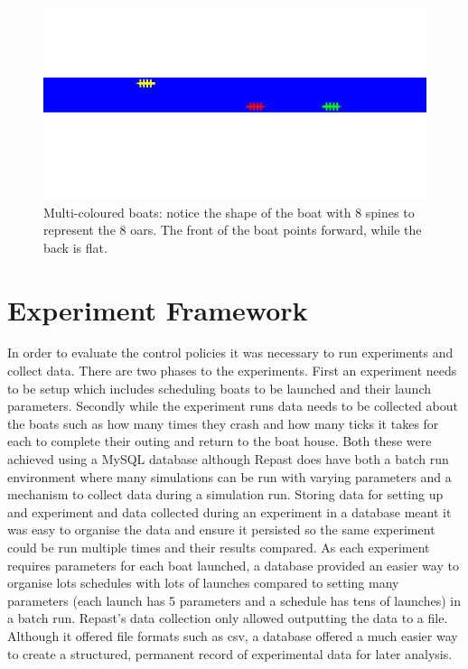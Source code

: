     \begin{figure}[h]
    \begin{center}
      \includegraphics[scale=0.3]{images/boats.png}
      \caption{Multi-coloured boats: notice the shape of the boat with 8 spines to represent the 8 oars. The front of the boat points forward, while the back is flat.}
      \label{techissues:fig:boats}
    \end{center}
    \end{figure}
      
  \section{Experiment Framework}
  In order to evaluate the control policies it was necessary to run experiments and collect data. There are two phases to the experiments. First an experiment needs to be setup which includes scheduling boats to be launched and their launch parameters. Secondly while the experiment runs data needs to be collected about the boats such as how many times they crash and how many ticks it takes for each to complete their outing and return to the boat house. Both these were achieved using a MySQL database although Repast does have both a batch run environment where many simulations can be run with varying parameters and a mechanism to collect data during a simulation run. Storing data for setting up and experiment and data collected during an experiment in a database meant it was easy to organise the data and ensure it persisted so the same experiment could be run multiple times and their results compared. As each experiment requires parameters for each boat launched, a database provided an easier way to organise lots schedules with lots of launches compared to setting many parameters (each launch has 5 parameters and a schedule has tens of launches) in a batch run. Repast's data collection only allowed outputting the data to a file. Although it offered file formats such as csv, a database offered a much easier way to create a structured, permanent record of experimental data for later analysis.
  
